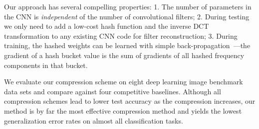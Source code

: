 \documentclass{article} %
\begin{document}
Our approach has several compelling properties:
1. The number of parameters in the CNN is \emph{independent} of the number of convolutional filters; 2. During testing we only need to add a low-cost hash function and the inverse DCT transformation to any existing CNN code for filter reconstruction; 3. During training, the hashed weights can be learned with simple back-propagation~\cite{bishop1995neural}---the gradient of a hash bucket value is the sum of gradients of all hashed frequency components in that bucket.

We evaluate our compression scheme on eight deep learning image benchmark data sets and compare against four competitive baselines. Although all compression schemes lead to lower test accuracy as the compression increases, our \abbrev{} method is by far the most effective compression method and yields the lowest generalization error rates on almost all classification tasks.
\end{document}
